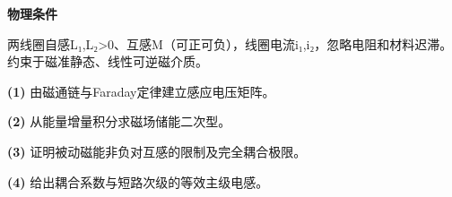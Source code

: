 \textbf{物理条件}\par 两线圈自感L₁,L₂>0、互感M（可正可负），线圈电流i₁,i₂，忽略电阻和材料迟滞。约束于磁准静态、线性可逆磁介质。
\par\noindent\textbf{(1)} 由磁通链与Faraday定律建立感应电压矩阵。
\par\noindent\textbf{(2)} 从能量增量积分求磁场储能二次型。
\par\noindent\textbf{(3)} 证明被动磁能非负对互感的限制及完全耦合极限。
\par\noindent\textbf{(4)} 给出耦合系数与短路次级的等效主级电感。
